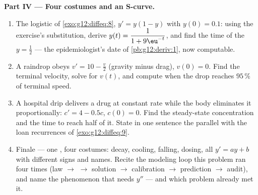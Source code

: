 \begin{problem}
\medskip
\noindent\textbf{Part IV --- Four costumes and an S-curve.}
\begin{enumerate}[resume]
  \item The logistic  of \cref{exo:g12:diffeq:8},
        $y' = y(1 - y)$ with $y(0) = 0.1$: using the exercise's
        substitution, derive
        $y(t) = \dfrac{1}{1 + 9\eu^{-t}}$, and find the time of
        the  $y = \frac12$ --- the
        epidemiologist's date of \cref{pb:g12:deriv:1}, now
        computable.
  \item A raindrop obeys $v' = 10 - \frac v2$ (gravity minus
        drag), $v(0) = 0$. Find the terminal velocity, solve
        for $v(t)$, and compute when the drop reaches
        $95\,\%$ of terminal speed.
  \item A hospital drip delivers a drug at constant rate while
        the body eliminates it proportionally:
        $c' = 4 - 0.5c$, $c(0) = 0$. Find the steady-state
        concentration and the time to reach half of it. State
        in one sentence the parallel with the loan recurrences
        of \cref{exo:g12:diffeq:9}.
  \item Finale --- one , four costumes: decay, cooling,
        falling, dosing, all $y' = ay + b$ with different signs
        and names. Recite the modeling loop this problem ran
        four times (law $\to$  $\to$ solution $\to$
        calibration $\to$ prediction $\to$ audit), and name
        the phenomenon that needs $y''$ --- and which problem
        already met it.
\end{enumerate}
\end{problem}
